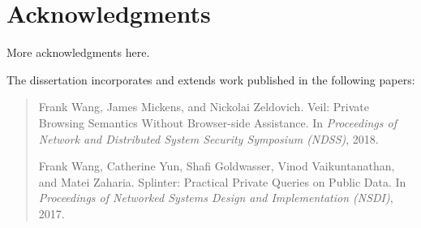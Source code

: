\chapter*{Acknowledgments}

More acknowledgments here.

\asterism

The dissertation incorporates and extends work published
in the following papers:

\begin{quote}

  Frank Wang, James Mickens, and Nickolai Zeldovich.
  \newblock Veil: Private Browsing Semantics Without Browser-side Assistance.
  \newblock In \emph{Proceedings of Network and Distributed System Security Symposium (\mbox{NDSS})},
  2018.
  
   Frank Wang, Catherine Yun, Shafi Goldwasser, Vinod Vaikuntanathan, and Matei Zaharia.
  \newblock Splinter: Practical Private Queries on Public Data.
  \newblock In \emph{Proceedings of Networked Systems Design
  	and Implementation (\mbox{NSDI})}, 2017.
  
\end{quote}
